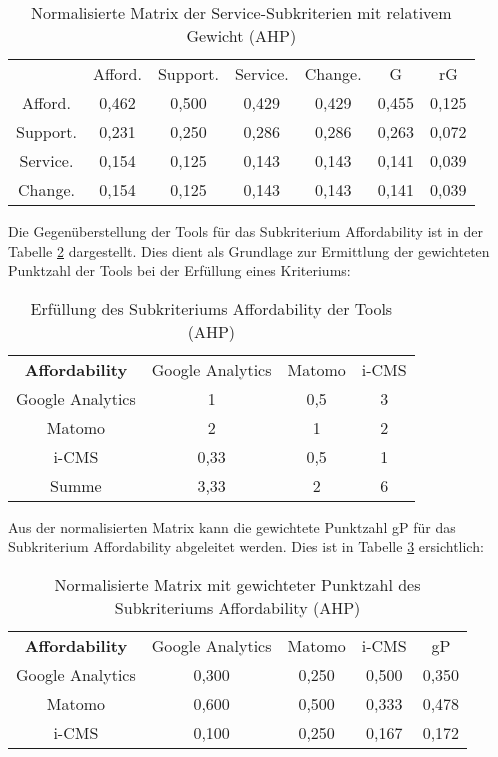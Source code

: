 \begin{table}[h]
  \centering
  \begin{tabular}{ccccccc}
    & Afford. & Support. & Service. & Change. & G & rG \\
    Afford. & 0,462 & 0,500 & 0,429 & 0,429 & 0,455 & 0,125 \\
    Support. & 0,231 & 0,250 & 0,286 & 0,286 & 0,263 & 0,072 \\
    Service. & 0,154 & 0,125 & 0,143 & 0,143 & 0,141 & 0,039 \\
    Change. & 0,154 & 0,125 & 0,143 & 0,143 & 0,141 & 0,039 \\
    \end{tabular} 
  \caption{Normalisierte Matrix der Service-Subkriterien mit relativem Gewicht (AHP)}
  \label{tab:MatrixsubkritservNorm}
  \end{table}

  Die Gegenüberstellung der Tools für das Subkriterium Affordability ist in der Tabelle \ref{tab:matrixAffordTools} dargestellt. Dies dient als Grundlage zur Ermittlung der gewichteten Punktzahl der Tools bei der Erfüllung eines Kriteriums:

  \begin{table}[h]
    \centering
    \begin{tabular}{cccc}
      \textbf{Affordability} & Google Analytics & Matomo & i-CMS \\
      Google Analytics & 1 & 0,5 & 3 \\
      Matomo & 2 & 1 & 2 \\
      i-CMS & 0,33 & 0,5 & 1 \\
      Summe & 3,33 & 2 & 6 \\
      \end{tabular} 
    \caption{Erfüllung des Subkriteriums Affordability der Tools (AHP)}
    \label{tab:matrixAffordTools}
    \end{table}

    Aus der normalisierten Matrix kann die gewichtete Punktzahl gP für das Subkriterium Affordability abgeleitet werden. Dies ist in Tabelle \ref{tab:matrixAffordNormalized} ersichtlich:

    \begin{table}[h]
      \centering
      \begin{tabular}{ccccc}
        \textbf{Affordability} & Google Analytics & Matomo & i-CMS & gP \\
        Google Analytics & 0,300 & 0,250 & 0,500 & 0,350 \\
        Matomo & 0,600 & 0,500 & 0,333 & 0,478 \\
        i-CMS & 0,100 & 0,250 & 0,167 & 0,172 \\
        \end{tabular} 
      \caption{Normalisierte Matrix mit gewichteter Punktzahl des Subkriteriums Affordability (AHP)}
      \label{tab:matrixAffordNormalized}
      \end{table}

